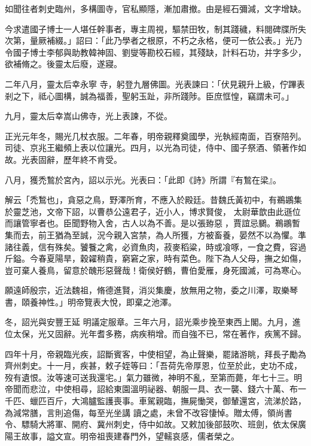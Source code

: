 \begin{pinyinscope}
 如聞往者刺史臨州，多構圖寺，官私顯隱，漸加肅撤。由是經石彌減，文字增缺。



 今求遣國子博士一人堪任幹事者，專主周視，驅禁田牧，制其踐穢，料閱碑牒所失次第，量厥補綴。」詔曰：「此乃學者之根原，不朽之永格，便可一依公表。」光乃令國子博士李郁與助教韓神固、劉燮等勘校石經，其殘缺，計料石功，并字多少，欲補脩之。後靈太后廢，遂寢。



 二年八月，靈太后幸永寧
 寺，躬登九層佛圖。光表諫曰：「伏見親升上級，佇蹕表剎之下，祗心圖構，誠為福善，聖躬玉趾，非所踐陟。臣庶恇惶，竊謂未可。」



 九月，靈太后幸嵩山佛寺，光上表諫，不從。



 正光元年冬，賜光几杖衣服。二年春，明帝親釋奠國學，光執經南面，百寮陪列。司徒、京兆王繼頻上表以位讓光。四月，以光為司徒，侍中、國子祭酒、領著作如故。光表固辭，歷年終不肯受。



 八月，獲禿鶖於宮內，詔以示光。光表曰：「此即《詩》所謂『有鶖在梁』。



 解云「禿鶖也」，貪惡之鳥，野澤所育，不應入於殿廷。昔魏氏黃初中，有鵜鶘集於靈芝池，文帝下詔，以曹恭公遠君子，近小人，博求賢俊，
 太尉華歆由此遜位而讓管寧者也。臣聞野物入舍，古人以為不善。是以張臶惡𪀼，賈誼忌鵩。鵜鶘暫集而去，前王猶為至誠，況今親入宮禁，為人所獲，方被畜養，晏然不以為懼。準諸往義，信有殊矣。饕餮之禽，必資魚肉，菽麥稻粱，時或飡啄，一食之費，容過斤鎰。今春夏陽旱，穀糴稍貴，窮窘之家，時有菜色。陛下為人父母，撫之如傷，豈可棄人養鳥，留意於醜形惡聲哉！衛侯好鶴，曹伯愛雁，身死國滅，可為寒心。



 願遠師殷宗，近法魏祖，脩德進賢，消災集慶，放無用之物，委之川澤，取樂琴書，頤養神性。」明帝覽表大悅，即棄之池澤。



 冬，詔光與安豐王延
 明議定服章。三年六月，詔光乘步挽至東西上閣。九月，進位太保，光又固辭。光年耆多務，病疾稍增。而自強不已，常在著作，疾篤不歸。



 四年十月，帝親臨光疾，詔斷賓客，中使相望，為止聲樂，罷諸游眺，拜長子勵為齊州刺史。十一月，疾甚，敕子姪等曰：「吾荷先帝厚恩，位至於此，史功不成，歿有遺恨。汝等速可送我還宅。」氣力雖微，神明不亂，至第而薨，年七十三。明帝聞而悲泣，中使相尋，詔給東園溫明祕器、朝服一具、衣一襲、錢六十萬、布一千匹、蠟匹百斤，大鴻臚監護喪事。車駕親臨，撫屍慟哭，御輦還宮，流涕於路，為減常膳，言則追傷，每至光坐講
 讀之處，未曾不改容悽悼。贈太傅，領尚書令、驃騎大將軍、開府、冀州刺史，侍中如故。又敕加後部鼓吹、班劍，依太保廣陽王故事，謚文宣。明帝祖喪建春門外，望轜哀感，儒者榮之。




\end{pinyinscope}
